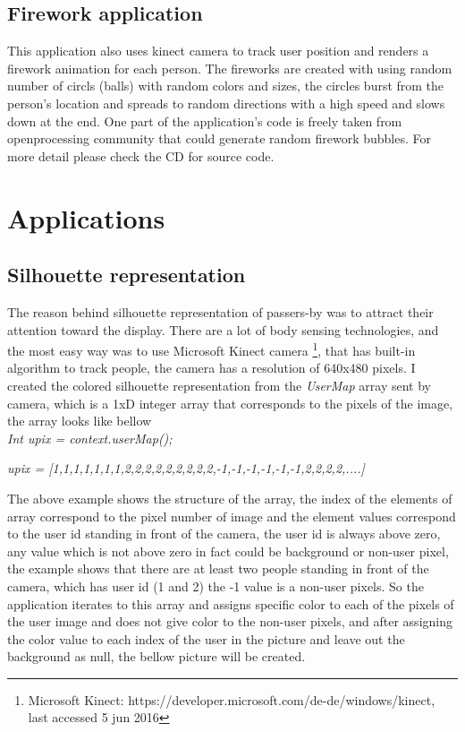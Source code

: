 \subsection{Firework application}
This application also uses kinect camera to track user position and renders a firework animation for each person.
The fireworks are created with using random number of circls (balls) with random colors and sizes, the circles burst from the person's location and spreads to random directions with a high speed and slows down at the end. One part of the application's code is freely taken from openprocessing community that could generate random firework bubbles.
For more detail please check the CD for source code.
\fi


\section{Applications}

\subsection{Silhouette representation}
The reason behind silhouette representation of passers-by was to attract their attention toward the display. There are a lot of body sensing technologies, and the most easy way was to use Microsoft Kinect camera \footnote{Microsoft Kinect: https://developer.microsoft.com/de-de/windows/kinect, last accessed 5 jun 2016}, that has built-in algorithm to track people, the camera has a resolution of 640x480 pixels. I created the colored silhouette representation from the \emph{UserMap} array sent by camera, which is a 1xD integer array that corresponds to the pixels of the image, the array looks like bellow \\

\emph {Int upix = context.userMap();}

\emph{upix = [1,1,1,1,1,1,1,2,2,2,2,2,2,2,2,2,-1,-1,-1,-1,-1,-1,2,2,2,2,....]}

The above example shows the structure of the array, the index of the elements of array correspond to the pixel number of image and the element values correspond to the user id standing in front of the camera, the user id is always above zero, any value which is not above zero in fact could be background or non-user pixel, the example shows that there are at least two people standing in front of the camera, which has user id (1 and 2) the -1 value is a non-user pixels. 
So the application iterates to this array and assigns specific color to each of the pixels of the user image and does not give color to the non-user pixels, and after assigning the color value to each index of the user in the picture and leave out the background as null, the bellow picture will be created.




